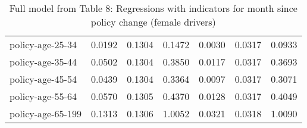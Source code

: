 \documentclass[10pt]{article}
\begin{document}
\begin{table}[ht]
\begin{tabular}{lrrrrrr}
  policy-age-25-34 & 0.0192 & 0.1304 & 0.1472 & 0.0030 & 0.0317 & 0.0933 \\ 
  policy-age-35-44 & 0.0502 & 0.1304 & 0.3850 & 0.0117 & 0.0317 & 0.3693 \\ 
  policy-age-45-54 & 0.0439 & 0.1304 & 0.3364 & 0.0097 & 0.0317 & 0.3071 \\ 
  policy-age-55-64 & 0.0570 & 0.1305 & 0.4370 & 0.0128 & 0.0317 & 0.4049 \\ 
  policy-age-65-199 & 0.1313 & 0.1306 & 1.0052 & 0.0321 & 0.0318 & 1.0090 \\ 
   \hline
\end{tabular}
\caption{Full model from Table 8: Regressions with indicators for month since policy change (female drivers)} 
\label{tab_8_all_pts_F}
\end{table}


\clearpage
\pagebreak



\end{document}
